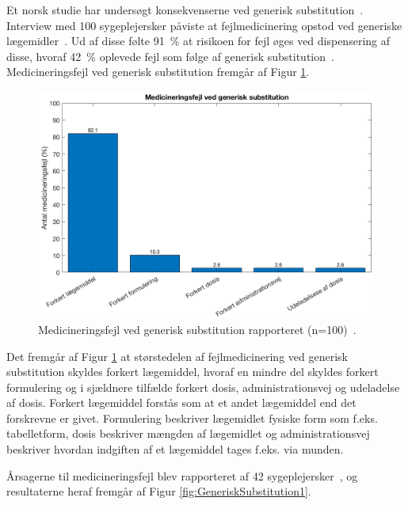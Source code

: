 Et norsk studie har undersøgt konsekvenserne ved generisk substitution~\citep{Hakonsen2010}. Interview med 100 sygeplejersker påviste at fejlmedicinering opstod ved generiske lægemidler~\citep{Hakonsen2010}. Ud af disse følte %
91~\% at risikoen for fejl øges ved dispensering af disse, hvoraf 42~\% oplevede fejl som følge af generisk substitution~\citep{Hakonsen2010}.
Medicineringsfejl ved generisk substitution fremgår af Figur \ref{fig:GeneriskSubstitution}.

\begin{figure}[H]\centering	\includegraphics[width=1\textwidth]{billeder/GenSub.png} 
	\caption{Medicineringsfejl ved generisk substitution rapporteret (n=100)~\citep{Hakonsen2010}.}
	\label{fig:GeneriskSubstitution}  
\end{figure}

Det fremgår af Figur \ref{fig:GeneriskSubstitution} at størstedelen af fejlmedicinering ved generisk substitution skyldes forkert lægemiddel, hvoraf en mindre del skyldes forkert formulering og i sjældnere tilfælde forkert dosis, administrationsvej og udeladelse af dosis. Forkert lægemiddel forstås som at et andet lægemiddel end det forskrevne er givet. Formulering beskriver lægemidlet fysiske form som f.eks. tabelletform, dosis beskriver mængden af lægemidlet og administrationsvej beskriver hvordan indgiften af et lægemiddel tages f.eks. via munden.

Årsagerne til medicineringsfejl blev rapporteret af 42 sygeplejersker~\citep{Hakonsen2010}, og resultaterne heraf fremgår af Figur \ref{fig:GeneriskSubstitution1}.

